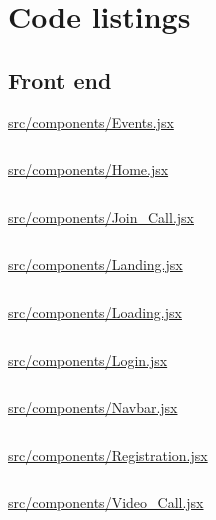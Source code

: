 \appendix

\chapter{Code listings}

\section{Front end}

\underline{src/components/Events.jsx}

\inputminted[linenos, bgcolor=lightestgray, breaklines, breakanywhere]{jsx}{../Video-Conferencer/src/components/Events.jsx}

\underline{src/components/Home.jsx}

\inputminted[linenos, bgcolor=lightestgray, breaklines, breakanywhere]{jsx}{../Video-Conferencer/src/components/Home.jsx}

\underline{src/components/Join\_Call.jsx}

\inputminted[linenos, bgcolor=lightestgray, breaklines, breakanywhere]{jsx}{../Video-Conferencer/src/components/Join_Call.jsx}

\underline{src/components/Landing.jsx}

\inputminted[linenos, bgcolor=lightestgray, breaklines, breakanywhere]{jsx}{../Video-Conferencer/src/components/Landing.jsx}

\underline{src/components/Loading.jsx}

\inputminted[linenos, bgcolor=lightestgray, breaklines, breakanywhere]{jsx}{../Video-Conferencer/src/components/Loading.jsx}

\underline{src/components/Login.jsx}

\inputminted[linenos, bgcolor=lightestgray, breaklines, breakanywhere]{jsx}{../Video-Conferencer/src/components/Login.jsx}

\underline{src/components/Navbar.jsx}

\inputminted[linenos, bgcolor=lightestgray, breaklines, breakanywhere]{jsx}{../Video-Conferencer/src/components/Navbar.jsx}

\underline{src/components/Registration.jsx}

\inputminted[linenos, bgcolor=lightestgray, breaklines, breakanywhere]{jsx}{../Video-Conferencer/src/components/Registration.jsx}

\underline{src/components/Video\_Call.jsx}

\inputminted[linenos, bgcolor=lightestgray, breaklines, breakanywhere]{jsx}{../Video-Conferencer/src/components/Video_Call.jsx}

